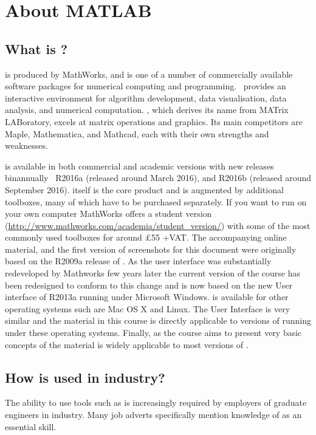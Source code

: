 \chapter*{About MATLAB}

\section{What is \mlab?}
\mlab is produced by MathWorks, and is one of a number of commercially available software packages for numerical computing and programming. \mlab\ provides an interactive environment for algorithm development, data visualisation, data analysis, and numerical computation. \mlab, which derives its name from MATrix LABoratory, excels at matrix operations and graphics. Its main competitors are Maple, Mathematica, and Mathcad, each with their own strengths and weaknesses. 

\mlab is available in both commercial and academic versions with new releases binannually \eg\ R2016a (released around March 2016), and R2016b (released around September 2016). \mlab itself is the core product and is augmented by additional toolboxes, many of which have to be purchased separately. If you want to run \mlab on your own computer MathWorks offers a student version (\href{http://www.mathworks.com/academia/student_version/}{http://www.mathworks.com/academia/student\_version/}) with some of the most commonly used toolboxes for around \pounds55 +VAT. The accompanying online material, and the first version of screenshots for this document were originally based on the R2009a release of \mlab. As the \mlab user interface was substantially redeveloped by Mathworks few years later the current version of the course has been redesigned to conform to this change and is now based on the new User interface of \mlab R2013a running under Microsoft Windows. \mlab is available for other operating systems such are Mac OS X and Linux. The User Interface is very similar and the material in this course is directly applicable to versions of \mlab running under these operating systems. Finally, as the course aims to present very basic concepts of \mlab the material is widely applicable to most versions of \mlab.

\section{How is \mlab used in industry?}
The ability to use tools such as \mlab is increasingly required by employers of graduate engineers in industry. Many job adverts specifically mention knowledge of \mlab as an essential skill.

